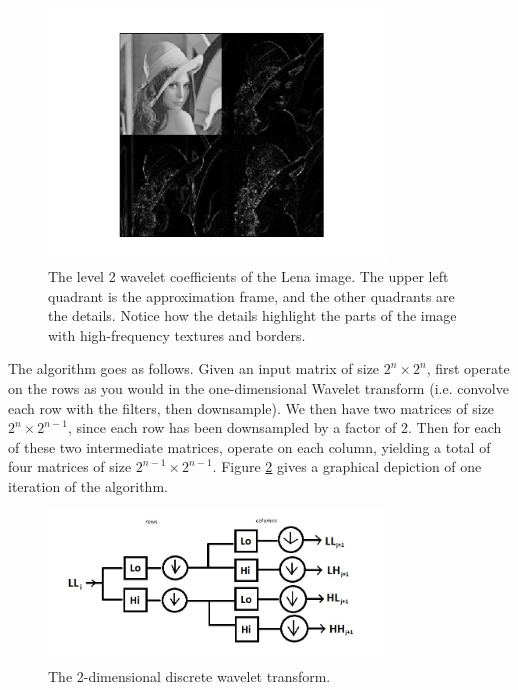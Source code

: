 \begin{figure}
    \includegraphics[width=0.8\textwidth]{dwt2D.pdf}
    \caption{The level 2 wavelet coefficients of the Lena image. The upper left quadrant 
    is the approximation frame, and the other quadrants are the details. Notice how the 
    details highlight the parts of the image with high-frequency textures and borders.}
    \label{fig:dwt2D}
\end{figure}

The algorithm goes as follows.
Given an input matrix of size $2^n \times 2^n$, first operate on the rows as you would
in the one-dimensional Wavelet transform (i.e. convolve each row with the filters, then
downsample).
We then have two matrices of size $2^n \times 2^{n-1}$,
since each row has been downsampled by a factor of 2. Then for each of these two
intermediate matrices, operate on each column, yielding a total of four matrices of
size $2^{n-1} \times 2^{n-1}$. Figure \ref{fig:2dwt}
gives a graphical depiction of one iteration of the algorithm.

\begin{figure}[t]
    \includegraphics[width=0.8\textwidth]{2dwt.jpg}
    \caption{The 2-dimensional discrete wavelet transform.}
    \label{fig:2dwt}
\end{figure}


